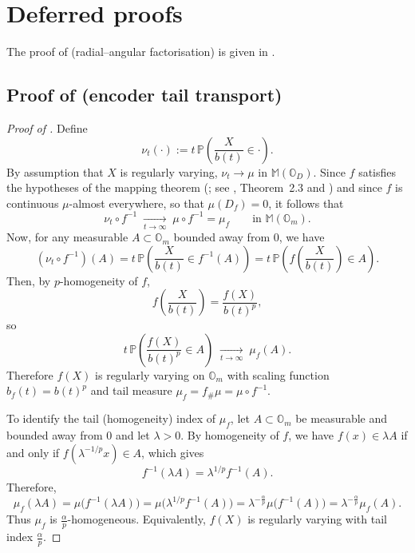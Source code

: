 
\section{Deferred proofs}
\label{sec:appendix:proofs}

The proof of  (radial--angular factorisation) is given in .

\subsection{Proof of
\texorpdfstring{}{Proposition~\ref*{prop:reg-variation-under-homogeneous-encoders}}
(encoder tail transport)}
\label{sec:appendix:proof-encoder-tail-transport}

\begin{proof}[Proof of ]
Define
\[
\nu_t(\cdot)
:=
t\,\mathbb{P}\!\left(\frac{X}{b(t)}\in \cdot\right).
\]
By assumption that \(X\) is regularly varying, \(\nu_t \to \mu\) in \(\mathbb{M}(\mathbb{O}_D)\). Since \(f\) satisfies the hypotheses of the mapping theorem (; see \cite{lindskog_regularly_2014}, Theorem~2.3 and \cite[Prop.~3.12]{Resnick_2007}) and since \(f\) is continuous \(\mu\)-almost everywhere, so that \(\mu(D_f)=0\), it follows that
\[
\nu_t \circ f^{-1}
\;\xrightarrow[t\to\infty]{}\;
\mu\circ f^{-1}
=
\mu_f
\qquad
\text{in } \mathbb{M}(\mathbb{O}_m).
\]
Now, for any measurable \(A\subset\mathbb{O}_m\) bounded away from \(0\), we have
\[
(\nu_t\circ f^{-1})(A)
=
t\,\mathbb{P}\!\left(\frac{X}{b(t)} \in f^{-1}(A)\right)
=
t\,\mathbb{P}\!\left(f\!\left(\frac{X}{b(t)}\right)\in A\right).
\]
Then, by \(p\)-homogeneity of \(f\),
\[
f\!\left(\frac{X}{b(t)}\right)
=
\frac{f(X)}{b(t)^p},
\]
so
\[
t\,\mathbb{P}\!\left(\frac{f(X)}{b(t)^p}\in A\right)
\;\xrightarrow[t\to\infty]{}\;
\mu_f(A).
\]
Therefore \(f(X)\) is regularly varying on \(\mathbb{O}_m\) with scaling function \(b_f(t)=b(t)^p\) and tail measure \(\mu_f=f_{\#}\mu = \mu\circ f^{-1}\).

To identify the tail (homogeneity) index of \(\mu_f\), let \(A\subset\mathbb{O}_m\) be measurable and bounded away from \(0\) and let \(\lambda>0\). By homogeneity of \(f\), we have \(f(x)\in\lambda A\) if and only if \(f(\lambda^{-1/p}x)\in A\), which gives
\[
f^{-1}(\lambda A)=\lambda^{1/p} f^{-1}(A).
\]
Therefore,
\[
\mu_f(\lambda A)
=
\mu\bigl(f^{-1}(\lambda A)\bigr)
=
\mu\bigl(\lambda^{1/p} f^{-1}(A)\bigr)
=
\lambda^{-\frac{\alpha}{p}}\mu\bigl(f^{-1}(A)\bigr)
=
\lambda^{-\frac{\alpha}{p}}\mu_f(A).
\]
Thus \(\mu_f\) is \(\frac{\alpha}{p}\)-homogeneous. Equivalently, \(f(X)\) is regularly varying with tail index \(\frac{\alpha}{p}\).
\end{proof}

